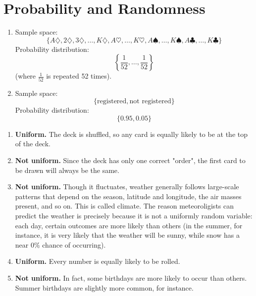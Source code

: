 \section{Probability and Randomness}

\begin{answer}
    \renewcommand{\labelenumi}{(\alph{enumi})} 
    \begin{enumerate}
        \item Sample space: 
        \[
            \{A\diamondsuit, 2\diamondsuit, 3\diamondsuit, \ldots, K\diamondsuit, 
            A\heartsuit,\ldots,K\heartsuit,
            A\spadesuit,\ldots,K\spadesuit,
            A\clubsuit,\ldots,K\clubsuit\}  
        \]
        Probability distribution: 
        \[
            \left\{\frac{1}{52}, \ldots, \frac{1}{52}\right\} 
        \]
        (where $\frac{1}{52}$ is repeated 52 times).
        \item Sample space:
        \[
            \{\text{registered}, \text{not registered}\}
        \]
        Probability distribution:
        \[
            \{0.95, 0.05\}
        \]
    \end{enumerate}
\end{answer}

\begin{answer}
    \renewcommand{\labelenumi}{(\alph{enumi})} 
    \begin{enumerate}
        \item \textbf{Uniform.} The deck is shuffled, so any card is equally likely 
        to be at the top of the deck.
        \item \textbf{Not uniform.} Since the deck has only one correct "order", the first card to be drawn will always be the same.
        \item \textbf{Not uniform.} Though it fluctuates, weather generally follows 
        large-scale patterns that depend on the season, latitude and longitude,
        the air masses present, and so on. This is called climate. The reason 
        meteoroligists can predict the weather is precisely because it is 
        not a uniformly random variable: each day, certain outcomes are more likely than others (in the summer, for instance, it is very likely that the weather will be sunny, while snow has a near 0\% chance of occurring).
        \item \textbf{Uniform.} Every number is equally likely to be rolled.
        \item \textbf{Not uniform.} In fact, some birthdays are more likely to occur 
        than others. Summer birthdays are slightly more common, for instance.\footnotemark
    \end{enumerate}
\end{answer}


